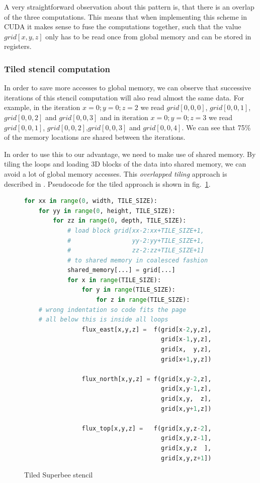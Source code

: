 \documentclass[a4paper,oneside]{memoir}
\begin{document}
A very straightforward observation about this pattern is, that there is an overlap of the three computations. This means that when implementing this scheme in CUDA it makes sense to fuse the computations together, such that the value $grid\left[x,y,z\right]$ only has to be read once from global memory and can be stored in registers.

\subsubsection{Tiled stencil computation}
In order to save more accesses to global memory, we can observe that successive iterations of this stencil computation will also read almost the same data.
For example, in the iteration $x = 0 ; y = 0 ; z = 2$ we read $grid[0,0,0]$, $grid[0,0,1]$,$grid[0,0,2]$ and $grid[0,0,3]$ and in iteration $x = 0 ; y = 0 ; z = 3$
we read $grid[0,0,1]$, $grid[0,0,2]$,$grid[0,0,3]$ and $grid[0,0,4]$. We can see that 75\% of the memory locations are shared between the iterations.

In order to use this to our advantage, we need to make use of shared memory.
By tiling the loops and loading 3D blocks of the data into shared memory, we can avoid a lot of global memory accesses. This \emph{overlapped tiling} approach is described in \cite{stencil_lift}.
Pseudocode for the tiled approach is shown in fig.~\ref{fig:stencil_tiled}.

\begin{figure}[hbtp]
    \caption{Tiled Superbee stencil}
    \label{fig:stencil_tiled}
    \begin{lstlisting}[language=python,frame=single]
for xx in range(0, width, TILE_SIZE):
    for yy in range(0, height, TILE_SIZE):
        for zz in range(0, depth, TILE_SIZE):
            # load block grid[xx-2:xx+TILE_SIZE+1, 
            #                 yy-2:yy+TILE_SIZE+1,
            #                 zz-2:zz+TILE_SIZE+1]
            # to shared memory in coalesced fashion
            shared_memory[...] = grid[...]
            for x in range(TILE_SIZE):
                for y in range(TILE_SIZE):
                    for z in range(TILE_SIZE):
    # wrong indentation so code fits the page
    # all below this is inside all loops     
                flux_east[x,y,z] =  f(grid[x-2,y,z], 
                                      grid[x-1,y,z],
                                      grid[x,  y,z],
                                      grid[x+1,y,z])

                flux_north[x,y,z] = f(grid[x,y-2,z], 
                                      grid[x,y-1,z],
                                      grid[x,y,  z],
                                      grid[x,y+1,z])

                flux_top[x,y,z] =   f(grid[x,y,z-2], 
                                      grid[x,y,z-1],
                                      grid[x,y,z  ],
                                      grid[x,y,z+1])
    \end{lstlisting}
\end{figure}
\end{document}
